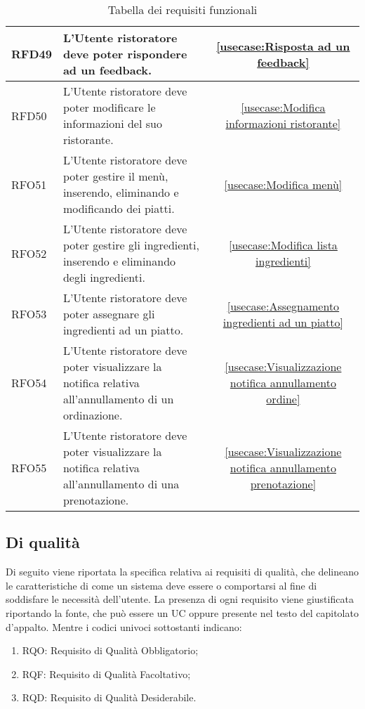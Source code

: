 \begin{table}[H]
\begin{tabularx}{\textwidth}{l|X|c}
		\hline
		RFD49       & L'Utente ristoratore deve poter rispondere ad un feedback.                                                              & \autoref{usecase:Risposta ad un feedback}            \\
		\hline
		RFD50       & L'Utente ristoratore deve poter modificare le informazioni del suo ristorante.                                          & \autoref{usecase:Modifica informazioni ristorante}   \\
		\hline
		RFO51       & L'Utente ristoratore deve poter gestire il menù, inserendo, eliminando e modificando dei piatti.                        & \autoref{usecase:Modifica menù}                      \\
		\hline
		RFO52       & L'Utente ristoratore deve poter gestire gli ingredienti, inserendo e eliminando degli ingredienti.                      & \autoref{usecase:Modifica lista ingredienti}         \\
		\hline
		RFO53       & L'Utente ristoratore deve poter assegnare gli ingredienti ad un piatto.                      							  & \autoref{usecase:Assegnamento ingredienti ad un piatto}         \\
		\hline
		RFO54       & L'Utente ristoratore deve poter visualizzare la notifica relativa all'annullamento di un ordinazione.                   & \autoref{usecase:Visualizzazione notifica annullamento ordine}         \\
		\hline
		RFO55       & L'Utente ristoratore deve poter visualizzare la notifica relativa all'annullamento di una prenotazione.                  & \autoref{usecase:Visualizzazione notifica annullamento prenotazione}         \\
	\end{tabularx}
	\caption{Tabella dei requisiti funzionali}
\end{table}


\subsection{Di qualità}

Di seguito viene riportata la specifica relativa ai requisiti di qualità, che delineano le caratteristiche di come un sistema
deve essere o comportarsi al fine di soddisfare le necessità dell'utente.
La presenza di ogni requisito viene giustificata riportando la fonte, che può essere un UC oppure presente
nel testo del capitolato d'appalto. Mentre i codici univoci sottostanti indicano:
\begin{enumerate}
	\item RQO: Requisito di Qualità Obbligatorio;
	\item RQF: Requisito di Qualità Facoltativo;
	\item RQD: Requisito di Qualità Desiderabile.
\end{enumerate}

